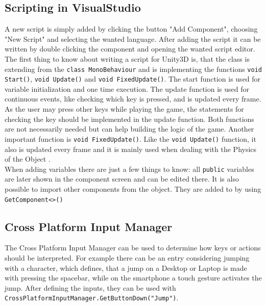 \documentclass[12pt, a4paper, titlepage]{article}
\begin{document}
\lstset{
basicstyle=\ttfamily\small,
numbers=left,
breaklines=true,
numberstyle=\tiny,
numbersep=5pt,
tabsize=3
}

\lstset{language=[Sharp]C}

\subsection{Scripting in VisualStudio}

A new script is simply added by clicking the button "Add Component", choosing "New Script" and selecting the wanted language. After adding the script it can be written by double clicking the component and opening the wanted script editor. \\
The first thing to know about writing a script for Unity3D is, that the class is extending from the \lstinline!class MonoBehaviour! and is implementing the functions \lstinline!void Start()!, \lstinline!void Update()! and \lstinline!void FixedUpdate()!. 
The start function is used for variable initialization and one time execution.
The update function is used for continuous events, like checking which key is pressed, and is updated every frame\cite{b1}. As the user may press other keys while playing the game, the statements for checking the key should be implemented in the update function. Both functions are not necessarily needed but can help building the logic of the game.
Another important function is \lstinline!void FixedUpdate()!. Like the \lstinline!void Update()! function, it also is updated every frame and it is mainly used when dealing with the Physics of the Object \cite{b1}. \\
When adding variables there are just a few things to know: all \lstinline!public! variables are later shown in the component screen and can be edited there. It is also possible to import other components from the object. They are added to by using \lstinline!GetComponent<>()!

\subsection{Cross Platform Input Manager}

The Cross Platform Input Manager can be used to determine how keys or actions should be interpreted. For example there can be an entry considering jumping with a character, which defines, that a jump on a Desktop or Laptop is made with pressing the spacebar, while on the smartphone a touch gesture activates the jump. After defining the inputs, they can be used with \lstinline!CrossPlatformInputManager.GetButtonDown("Jump")!. \\
\end{document}
